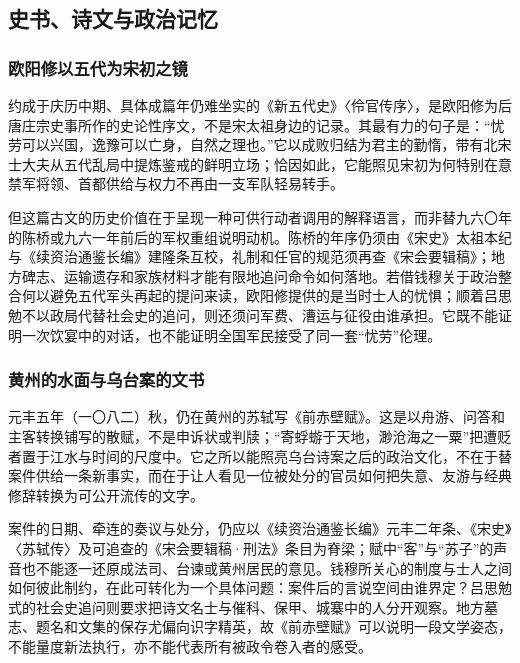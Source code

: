 \subsection{史书、诗文与政治记忆}

\subsubsection{欧阳修以五代为宋初之镜}

约成于庆历中期、具体成篇年仍难坐实的《新五代史》〈伶官传序〉，是欧阳修为后唐庄宗史事所作的史论性序文，不是宋太祖身边的记录。其最有力的句子是：“忧劳可以兴国，逸豫可以亡身，自然之理也。”它以成败归结为君主的勤惰，带有北宋士大夫从五代乱局中提炼鉴戒的鲜明立场；恰因如此，它能照见宋初为何特别在意禁军将领、首都供给与权力不再由一支军队轻易转手。

但这篇古文的历史价值在于呈现一种可供行动者调用的解释语言，而非替九六〇年的陈桥或九六一年前后的军权重组说明动机。陈桥的年序仍须由《宋史》太祖本纪与《续资治通鉴长编》建隆条互校，礼制和任官的规范须再查《宋会要辑稿》；地方碑志、运输遗存和家族材料才能有限地追问命令如何落地。若借钱穆关于政治整合何以避免五代军头再起的提问来读，欧阳修提供的是当时士人的忧惧；顺着吕思勉不以政局代替社会史的追问，则还须问军费、漕运与征役由谁承担。它既不能证明一次饮宴中的对话，也不能证明全国军民接受了同一套“忧劳”伦理。

\subsubsection{黄州的水面与乌台案的文书}

元丰五年（一〇八二）秋，仍在黄州的苏轼写《前赤壁赋》。这是以舟游、问答和主客转换铺写的散赋，不是申诉状或判牍；“寄蜉蝣于天地，渺沧海之一粟”把遭贬者置于江水与时间的尺度中。它之所以能照亮乌台诗案之后的政治文化，不在于替案件供给一条新事实，而在于让人看见一位被处分的官员如何把失意、友游与经典修辞转换为可公开流传的文字。

案件的日期、牵连的奏议与处分，仍应以《续资治通鉴长编》元丰二年条、《宋史》〈苏轼传〉及可追查的《宋会要辑稿·刑法》条目为脊梁；赋中“客”与“苏子”的声音也不能逐一还原成法司、台谏或黄州居民的意见。钱穆所关心的制度与士人之间如何彼此制约，在此可转化为一个具体问题：案件后的言说空间由谁界定？吕思勉式的社会史追问则要求把诗文名士与催科、保甲、城寨中的人分开观察。地方墓志、题名和文集的保存尤偏向识字精英，故《前赤壁赋》可以说明一段文学姿态，不能量度新法执行，亦不能代表所有被政令卷入者的感受。

